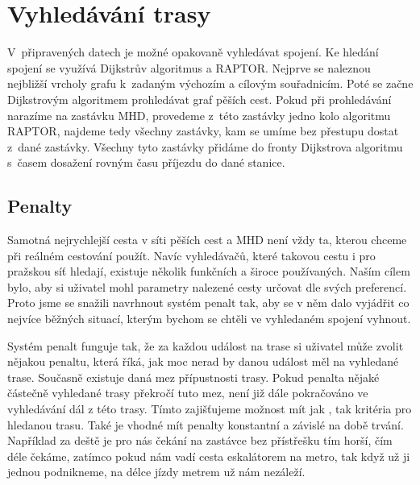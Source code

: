 \chapter{Vyhledávání trasy}
V~připravených datech je možné opakovaně vyhledávat spojení. Ke hledání spojení
se využívá Dijkstrův algoritmus a RAPTOR. Nejprve se naleznou nejbližší vrcholy
grafu k~zadaným výchozím a cílovým souřadnicím. Poté se začne Dijkstrovým
algoritmem prohledávat graf pěších cest. Pokud při prohledávání narazíme na
zastávku MHD, provedeme z~této zastávky jedno kolo algoritmu RAPTOR, najdeme
tedy všechny zastávky, kam se umíme bez přestupu dostat z~dané zastávky. Všechny
tyto zastávky přidáme do fronty Dijkstrova algoritmu s~časem dosažení rovným
času příjezdu do dané stanice. 

\section{Penalty}
Samotná nejrychlejší cesta v síti pěších cest a MHD není vždy ta, kterou chceme
při reálném cestování použít. Navíc vyhledávačů, které takovou cestu i pro
pražskou síť hledají, existuje několik funkčních a široce používaných. Naším
cílem bylo, aby si uživatel mohl parametry nalezené cesty určovat dle svých
preferencí. Proto jsme se snažili navrhnout systém penalt tak, aby se v něm dalo
vyjádřit co nejvíce běžných situací, kterým bychom se chtěli ve vyhledaném
spojení vyhnout. 

Systém penalt funguje tak, že za každou událost na trase si uživatel může zvolit
nějakou penaltu, která říká, jak moc nerad by danou událost měl na vyhledané
trase. Současně existuje daná mez přípustnosti trasy. Pokud penalta nějaké
částečně vyhledané trasy překročí tuto mez, není již dále pokračováno ve
vyhledávání dál z této trasy. Tímto zajišťujeme možnost mít jak , tak
 kritéria pro hledanou trasu. Také je vhodné mít penalty konstantní a
závislé na době trvání. Například za deště je pro nás čekání na zastávce bez
přístřešku tím horší, čím déle čekáme, zatímco pokud nám vadí cesta eskalátorem
na metro, tak když už ji jednou podnikneme, na délce jízdy metrem už nám
nezáleží.

